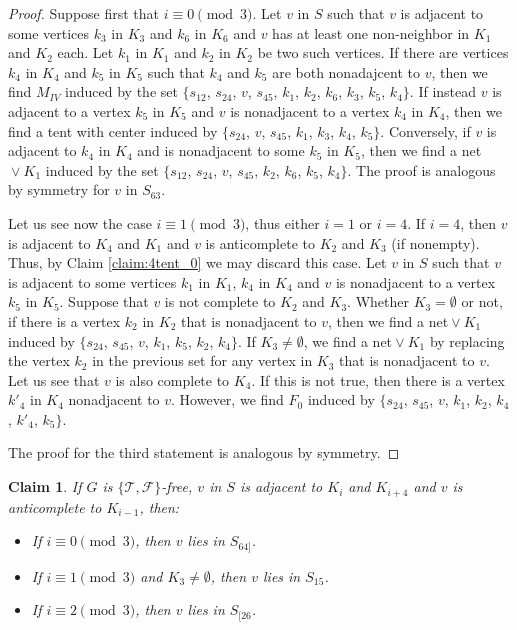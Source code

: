 \documentclass[12pt]{book}
\theoremstyle{plain}
\newtheorem{claim}[teo]{Claim}
\theoremstyle{remark}
\begin{document}
\begin{proof}
Suppose first  that $i \equiv 0 \pmod{3}$. Let $v$ in $S$ such that $v$ is adjacent to some vertices $k_3$ in $K_3$ and $k_6$ in $K_6$ and $v$ has at least one non-neighbor in $K_1$ and $K_2$ each. Let $k_1$ in $K_1$ and $k_2$ in $K_2$ be two such vertices.
	If there are vertices $k_4$ in $K_4$ and $k_5$ in $K_5$ such that $k_4$ and $k_5$ are both nonadajcent to $v$, then we find $M_{IV}$ induced by the set $\{ s_{12}$, $s_{24}$, $v$, $s_{45}$, $k_1$, $k_2$, $k_6$, $k_3$, $k_5$, $k_4 \}$.
	If instead $v$ is adjacent to a vertex $k_5$ in $K_5$ and $v$ is nonadjacent to a vertex $k_4$ in $K_4$, then we find a tent with center induced by $\{s_{24}$, $v$, $s_{45}$, $k_1$, $k_3$, $k_4$, $k_5\}$. Conversely, if $v$ is adjacent to $k_4$ in $K_4$ and is nonadjacent to some $k_5$ in $K_5$, then we find a net${}\vee{}K_1$ induced by the set $\{ s_{12}$, $s_{24}$, $v$, $s_{45}$, $k_2$, $k_6$, $k_5$, $k_4 \}$. The proof is analogous by symmetry for $v$ in $S_{63}$.
	
	Let us see now the case $i \equiv 1 \pmod 3$, thus either $i = 1$ or $i=4$. If $i=4$, then $v$ is adjacent to $K_4$ and $K_1$ and $v$ is anticomplete to $K_2$ and $K_3$ (if nonempty). Thus, by Claim \ref{claim:4tent_0} we may discard this case.
	Let $v$ in $S$ such that $v$ is adjacent to some vertices $k_1$ in $K_1$, $k_4$ in $K_4$ and $v$ is nonadjacent to a vertex $k_5$ in $K_5$. Suppose that $v$ is not complete to $K_2$ and $K_3$. %
	Whether $K_3 = \emptyset$ or not, if there is a vertex $k_2$ in $K_2$ that is nonadjacent to $v$, then we find a net${}\vee{}K_1$ induced by $\{ s_{24}$, $s_{45}$, $v$, $k_1$, $k_5$, $k_2$, $k_4 \}$.
	If $K_3 \neq \emptyset$, we find a net${}\vee{}K_1$ by replacing the vertex $k_2$ in the previous set for any vertex in $K_3$ that is nonadjacent to $v$. 
	Let us see that $v$ is also complete to $K_4$. If this is not true, then there is a vertex $k'_4$ in $K_4$ nonadjacent to $v$. However, we find $F_0$ induced by $\{ s_{24}$, $s_{45}$, $v$, $k_1$, $k_2$, $k_4$, $k'_4$, $k_5 \}$.
	
	The proof for the third statement is analogous by symmetry.
\end{proof}

\begin{claim} \label{claim:4tent_4}
	If $G$ is $\{ \mathcal{T}, \mathcal{F} \}$-free, $v$ in $S$ is adjacent to $K_i$ and $K_{i+4}$ and $v$ is anticomplete to $K_{i-1}$, then:
	\begin{itemize}
		\item If $i \equiv 0 \pmod{3}$, then $v$ lies in $S_{64]}$.
		\item If $i \equiv 1 \pmod 3$ and $K_3 \neq \emptyset$, then $v$ lies in $S_{15}$. 
		\item If $i \equiv 2 \pmod{3}$, then $v$ lies in $S_{[26}$.
	\end{itemize}
\end{claim}
\end{document}
